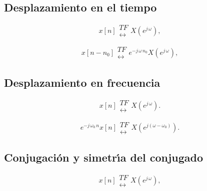 \subsection{Desplazamiento en el tiempo}

\begin{equation}
x\left[ n\right] 
\begin{array}{l}
TF \\ 
\leftrightarrow
\end{array}
X\left( e^{j \, \omega }\right) ,
\end{equation}

\begin{equation}
x\left[ n-n_{0}\right] 
\begin{array}{l}
TF \\ 
\leftrightarrow
\end{array}
e^{-j \, \omega \, n_{0}}X\left( e^{j \, \omega }\right) ,
\end{equation}

\subsection{Desplazamiento en frecuencia}

\begin{equation}
x\left[ n\right] 
\begin{array}{l}
TF \\ 
\leftrightarrow
\end{array}
X\left( e^{j \, \omega }\right).
\end{equation}

\begin{equation}
e^{-j \, \omega_{0} \, n}x\left[ n\right] 
\begin{array}{l}
TF \\ 
\leftrightarrow
\end{array}
X\left( e^{j\left( \omega -\omega _{0}\right) }\right).
\end{equation}

\subsection{Conjugaci\'{o}n y simetr\'{\i}a del conjugado}

\begin{equation}
x\left[ n\right] 
\begin{array}{l}
TF \\ 
\leftrightarrow
\end{array}
X\left( e^{j \, \omega }\right) ,
\end{equation}

